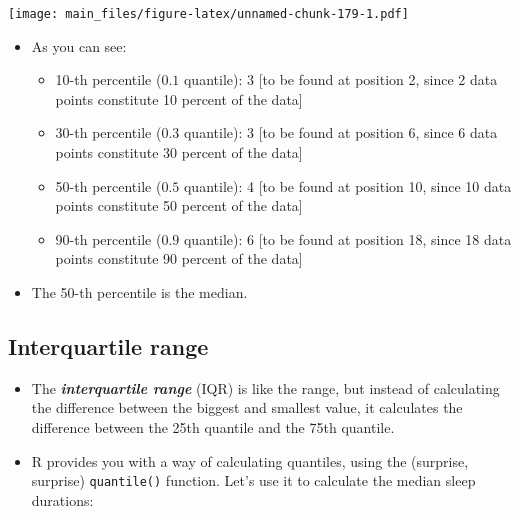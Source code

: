 \documentclass[
]{book}
\newenvironment{Shaded}{\begin{snugshade}}{\end{snugshade}}
\newcommand{\AttributeTok}[1]{\textcolor[rgb]{0.77,0.63,0.00}{#1}}
\newcommand{\DecValTok}[1]{\textcolor[rgb]{0.00,0.00,0.81}{#1}}
\newcommand{\FunctionTok}[1]{\textcolor[rgb]{0.00,0.00,0.00}{#1}}
\newcommand{\NormalTok}[1]{#1}
\newcommand{\SpecialCharTok}[1]{\textcolor[rgb]{0.00,0.00,0.00}{#1}}
\providecommand{\tightlist}{%
  \setlength{\itemsep}{0pt}\setlength{\parskip}{0pt}}
\begin{document}
\texttt{[image: main\_files/figure-latex/unnamed-chunk-179-1.pdf]}

\begin{itemize}
\tightlist
\item
  As you can see:

  \begin{itemize}
  \tightlist
  \item
    10-th percentile (\(0.1\) quantile): 3 {[}to be found at position 2, since 2 data points constitute 10 percent of the data{]}
  \item
    30-th percentile (\(0.3\) quantile): 3 {[}to be found at position 6, since 6 data points constitute 30 percent of the data{]}
  \item
    50-th percentile (\(0.5\) quantile): 4 {[}to be found at position 10, since 10 data points constitute 50 percent of the data{]}
  \item
    90-th percentile (\(0.9\) quantile): 6 {[}to be found at position 18, since 18 data points constitute 90 percent of the data{]}
  \end{itemize}
\item
  The 50-th percentile is the median.
\end{itemize}

\hypertarget{interquartile-range}{%
\subsection{Interquartile range}\label{interquartile-range}}

\begin{itemize}
\tightlist
\item
  The \textbf{\emph{interquartile range}} (IQR) is like the range, but instead of calculating the difference between the biggest and smallest value, it calculates the difference between the 25th quantile and the 75th quantile.
\item
  R provides you with a way of calculating quantiles, using the (surprise, surprise) \texttt{quantile()} function. Let's use it to calculate the median sleep durations:
\end{itemize}

\begin{Shaded}
\end{Shaded}
\end{document}
